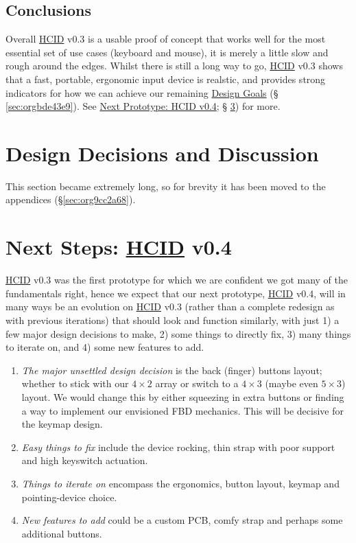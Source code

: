 \documentclass[logo,bsc,singlespacing,parskip]{infthesis}
\begin{document}
\section{Conclusions}
\label{sec:org34437bd}
Overall \hyperref[orgc00eca5]{HCID} v0.3 is a usable proof of concept that works well for the most essential set of use cases (keyboard and mouse), it is merely a little slow and rough around the edges.
Whilst there is still a long way to go, \hyperref[orgc00eca5]{HCID} v0.3 shows that a fast, portable, ergonomic input device is realstic, and provides strong indicators for how we can achieve our remaining \hyperref[sec:orgbde43e9]{Design Goals} (§ \ref{sec:orgbde43e9}). See \hyperref[sec:org1833e95]{Next Prototype: HCID v0.4}; § \ref{sec:org1833e95}) for more.
\chapter{Design Decisions and Discussion}
\label{sec:org9a7c67c}
This section became extremely long, so for brevity it has been moved to the appendices (\S \ref{sec:org9cc2a68}).

\chapter{Next Steps: \hyperref[orgc00eca5]{HCID} v0.4}
\label{sec:org1833e95}
\hyperref[orgc00eca5]{HCID} v0.3 was the first prototype for which we are confident we got  many of the fundamentals right, hence we expect that our next prototype,  \hyperref[orgc00eca5]{HCID} v0.4, will in many ways be an evolution on \hyperref[orgc00eca5]{HCID} v0.3 (rather than a complete redesign as with previous iterations) that should look and function similarly, with just 1) a few major design decisions to make, 2) some things to directly fix, 3) many things to iterate on, and  4) some new features to add.

\begin{enumerate}
\item \emph{The major unsettled design decision} is the back (finger) buttons layout; whether to stick with our \(4\times2\) array or switch to a \(4\times3\) (maybe even \(5\times3\)) layout.
We would change this by either squeezing in extra buttons or finding a way to implement our envisioned FBD mechanics. This will be decisive for the keymap design.

\item \emph{Easy things to fix} include the device rocking, thin strap with poor support and high keyswitch actuation.

\item \emph{Things to iterate on} encompass the ergonomics, button layout, keymap and pointing-device choice.

\item \emph{New features to add} could be a custom PCB, comfy strap and perhaps some additional buttons.
\end{enumerate}
\iffalse
\end{document}
